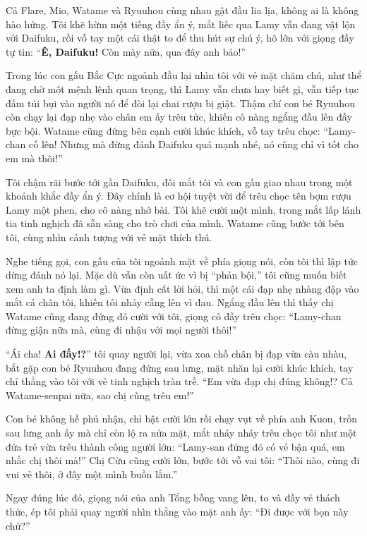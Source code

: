 \documentclass[../main.tex]{subfiles}
\begin{document}
Cả Flare, Mio, Watame và Ryuuhou cùng nhau gật đầu lia lịa, không ai là không hào hứng. Tôi khẽ hừm một tiếng đầy ẩn ý, mắt liếc qua Lamy vẫn đang vật lộn với Daifuku, rồi vỗ tay một cái thật to để thu hút sự chú ý, hô lớn với giọng đầy tự tin: ``\textbf{Ê, Daifuku!} Còn mày nữa, qua đây anh bảo!''

Trong lúc con gấu Bắc Cực ngoảnh đầu lại nhìn tôi với vẻ mặt chăm chú, như thể đang chờ một mệnh lệnh quan trọng, thì Lamy vẫn chưa hay biết gì, vẫn tiếp tục đấm túi bụi vào người nó để đòi lại chai rượu bị giật. Thậm chí con bé Ryuuhou còn chạy lại đạp nhẹ vào chân em ấy trêu tức, khiến cô nàng ngẩng đầu lên đầy bực bội. Watame cũng đứng bên cạnh cười khúc khích, vỗ tay trêu chọc: ``Lamy-chan cố lên! Nhưng mà đừng đánh Daifuku quá mạnh nhé, nó cũng chỉ vì tốt cho em mà thôi!''

Tôi chậm rãi bước tới gần Daifuku, đôi mắt tôi và con gấu giao nhau trong một khoảnh khắc đầy ẩn ý. Đây chính là cơ hội tuyệt vời để trêu chọc tên bợm rượu Lamy một phen, cho cô nàng nhớ bài. Tôi khẽ cười một mình, trong mắt lấp lánh tia tinh nghịch đã sẵn sàng cho trò chơi của mình. Watame cũng bước tới bên tôi, cùng nhìn cảnh tượng với vẻ mặt thích thú.


Nghe tiếng gọi, con gấu của tôi ngoảnh mặt về phía giọng nói, còn tôi thì lập tức dừng đánh nó lại. Mặc dù vẫn còn uất ức vì bị ``phản bội,'' tôi cũng muốn biết xem anh ta định làm gì. Vừa định cất lời hỏi, thì một cái đạp nhẹ nhàng đập vào mắt cá chân tôi, khiến tôi nhảy cẫng lên vì đau. Ngẩng đầu lên thì thấy chị Watame cũng đang đứng đó cười với tôi, giọng cô đầy trêu chọc: ``Lamy-chan đừng giận nữa mà, cùng đi nhậu với mọi người thôi!''

``Ái cha! \textbf{Ai đấy!?}'' tôi quay người lại, vừa xoa chỗ chân bị đạp vừa càu nhàu, bắt gặp con bé Ryuuhou đang đứng sau lưng, mặt nhăn lại cười khúc khích, tay chỉ thẳng vào tôi với vẻ tinh nghịch tràn trề. ``Em vừa đạp chị đúng không!? Cả Watame-senpai nữa, sao chị cũng trêu em!''

Con bé không hề phủ nhận, chỉ bật cười lớn rồi chạy vụt về phía anh Kuon, trốn sau lưng anh ấy mà chỉ còn lộ ra nửa mặt, mắt nháy nháy trêu chọc tôi như một đứa trẻ vừa trêu thành công người lớn: ``Lamy-san đứng đó có vẻ bận quá, em nhắc chị thôi mà!'' Chị Cừu cũng cười lớn, bước tới vỗ vai tôi: ``Thôi nào, cùng đi vui vẻ thôi, ở đây một mình buồn lắm.''

Ngay đúng lúc đó, giọng nói của anh Tổng bỗng vang lên, to và đầy vẻ thách thức, ép tôi phải quay người nhìn thẳng vào mặt anh ấy: ``Đi được với bọn này chứ?''
\end{document}
